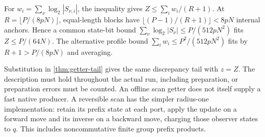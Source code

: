 For $w_i=\sum_\nu\log_2|S_{\nu,i}|$, the inequality gives
$Z\le\sum_iw_i/(R+1)$. At $R=\lfloor P/(8pN)\rfloor$, equal-length
blocks have $\lfloor(P-1)/(R+1)\rfloor<8pN$ internal anchors. Hence a
common state-bit bound $\sum_\nu\log_2|S_\nu|\le P/(512pN^2)$ fits
$Z\le P/(64N)$. The alternative profile bound
$\sum_iw_i\le P^2/(512pN^2)$ fits by $R+1>P/(8pN)$ and averaging.

Substitution in \cref{thm:getter-tail} gives the same discrepancy tail with
$z=Z$. The description must hold throughout the actual run, including
preparation, or preparation errors must be counted. An offline scan getter
does not itself supply a fast native producer. A reversible scan has the
simpler radius-one implementation: retain its prefix state at each port,
apply the update on a forward move and its inverse on a backward move,
charging those observer states to $q$. This includes noncommutative finite
group prefix products.

